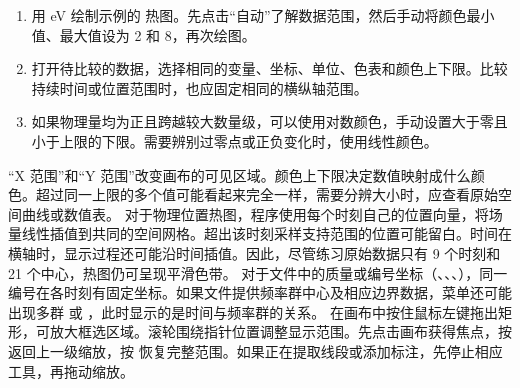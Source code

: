 \begin{enumerate}
\item 用 eV 绘制示例的  热图。先点击“自动”了解数据范围，然后手动将颜色最小值、最大值设为 2 和 8，再次绘图。
\item 打开待比较的数据，选择相同的变量、坐标、单位、色表和颜色上下限。比较持续时间或位置范围时，也应固定相同的横纵轴范围。
\item 如果物理量均为正且跨越较大数量级，可以使用对数颜色，手动设置大于零且小于上限的下限。需要辨别过零点或正负变化时，使用线性颜色。
\end{enumerate}
“X 范围”和“Y 范围”改变画布的可见区域。颜色上下限决定数值映射成什么颜色。超过同一上限的多个值可能看起来完全一样，需要分辨大小时，应查看原始空间曲线或数值表。
对于物理位置热图，程序使用每个时刻自己的位置向量，将场量线性插值到共同的空间网格。超出该时刻采样支持范围的位置可能留白。时间在横轴时，显示过程还可能沿时间插值。因此，尽管练习原始数据只有 9 个时刻和 21 个中心，热图仍可呈现平滑色带。
对于文件中的质量或编号坐标（、、、），同一编号在各时刻有固定坐标。如果文件提供频率群中心及相应边界数据，菜单还可能出现多群  或 ，此时显示的是时间与频率群的关系。
在画布中按住鼠标左键拖出矩形，可放大框选区域。滚轮围绕指针位置调整显示范围。先点击画布获得焦点，按  返回上一级缩放，按  恢复完整范围。如果正在提取线段或添加标注，先停止相应工具，再拖动缩放。
